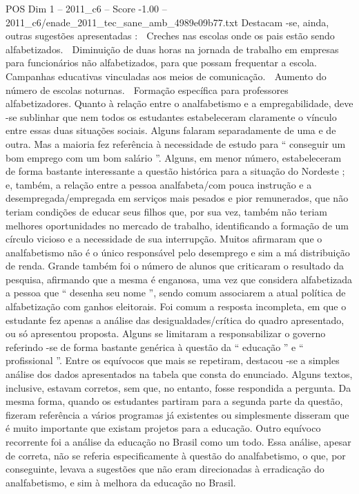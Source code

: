 \begin{textsample}{POS Dim 1 – 2011\_c6 – Score -1.00 – 2011\_c6/enade\_2011\_tec\_sane\_amb\_4989e09b77.txt}
Destacam -se, ainda, outras sugestões apresentadas :  Creches nas escolas onde os pais estão sendo alfabetizados.  Diminuição de duas horas na jornada de trabalho em empresas para funcionários não alfabetizados, para que possam frequentar a escola.  Campanhas educativas vinculadas aos meios de comunicação.  Aumento do número de escolas noturnas.  Formação específica para professores alfabetizadores.
Quanto à relação entre o analfabetismo e a empregabilidade, deve -se sublinhar que nem todos os estudantes estabeleceram claramente o vínculo entre essas duas situações sociais.
Alguns falaram separadamente de uma e de outra.
Mas a maioria fez referência à necessidade de estudo para “ conseguir um bom emprego com um bom salário ”.
Alguns, em menor número, estabeleceram de forma bastante interessante a questão histórica para a situação do Nordeste ; e, também, a relação entre a pessoa analfabeta/com pouca instrução e a desempregada/empregada em serviços mais pesados e pior remunerados, que não teriam condições de educar seus filhos que, por sua vez, também não teriam melhores oportunidades no mercado de trabalho, identificando a formação de um círculo vicioso e a necessidade de sua interrupção.
Muitos afirmaram que o analfabetismo não é o único responsável pelo desemprego e sim a má distribuição de renda.
Grande também foi o número de alunos que criticaram o resultado da pesquisa, afirmando que a mesma é enganosa, uma vez que considera alfabetizada a pessoa que “ desenha seu nome ”, sendo comum associarem a atual política de alfabetização com ganhos eleitorais.
Foi comum a resposta incompleta, em que o estudante fez apenas a análise das desigualdades/crítica do quadro apresentado, ou só apresentou proposta.
Alguns se limitaram a responsabilizar o governo referindo -se de forma bastante genérica à questão da “ educação ” e “ profissional ”.
Entre os equívocos que mais se repetiram, destacou -se a simples análise dos dados apresentados na tabela que consta do enunciado.
Alguns textos, inclusive, estavam corretos, sem que, no entanto, fosse respondida a pergunta.
Da mesma forma, quando os estudantes partiram para a segunda parte da questão, fizeram referência a vários programas já existentes ou simplesmente disseram que é muito importante que existam projetos para a educação.
Outro equívoco recorrente foi a análise da educação no Brasil como um todo.
Essa análise, apesar de correta, não se referia especificamente à questão do analfabetismo, o que, por conseguinte, levava a sugestões que não eram direcionadas à erradicação do analfabetismo, e sim à melhora da educação no Brasil.

\end{textsample}
